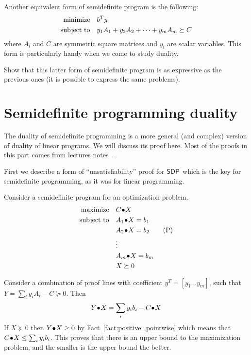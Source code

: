 \documentclass[a4paper,twoside,justified]{tufte-handout}
\begin{document}
Another equivalent form of semidefinite program is the following:
\begin{alignat*}{2}
  \text{minimize}\hspace{1em}& b^{T}y\\
  \text{subject to}\hspace{1em}& y_{1}A_{1} + y_{2}A_{2} + \cdots + y_{m}A_{m} \succeq C
\end{alignat*} 
where $ A_{i} $ and $ C $ are symmetric square matrices and $ y_{i} $
are scalar variables. This form is particularly handy when we come to
study duality.

\begin{exercise}
  Show that this latter form of semidefinite program is as expressive
  as the previous ones (\ie it is possible to express the same
  problems).
\end{exercise}

\section{Semidefinite programming duality}

The duality of semidefinite programming is a more general (and
complex) version of duality of linear programs. We will discuss its
proof here. Most of the proofs in this part comes from \Lovasz
lectures notes~\cite{lovasz2003semidefinite}.


First we describe a form of ``unsatisfiability'' proof for $ \mathsf{SDP} $
which is the key for semidefinite programming, as it was for linear
programming.

Consider a semidefinite program for an optimization problem. 
\begin{alignat}{2}
  \maximize \pointwiseprod{C}{X} \notag\\
  \subjectto \pointwiseprod{A_{1}}{X} = b_{1} \notag\\
  & \pointwiseprod{A_{2}}{X} = b_{2} \label{eq:sdp-primal}\tag{P}\\
  & \vdots \notag\\
  & \pointwiseprod{A_{m}}{X} = b_{m} \notag\\
  & X \succeq 0 \notag
\end{alignat}

Consider a combination of proof lines with coefficient $ y^{T}=
[y_{1}\ldots y_{m}]$, such that $ Y= \sum_{i}y_{i}A_{i} - C \succeq
0$. Then 
\begin{equation}
 {Y}\!\bullet\!{X}=\sum_{i}y_{i}b_{i} -{C}\!\bullet\!{X} 
\end{equation}
If $ X \succeq 0 $ then ${Y}\!\bullet\!{X} \geq 0$ by
Fact~\ref{fact:positive_pointwise} which means that $
{C}\!\bullet\!{X} \leq \sum_{i}y_{i}b_{i} $. This proves that there
is an upper bound to the maximization problem, and the smaller is the
upper bound the better.
\end{document}
